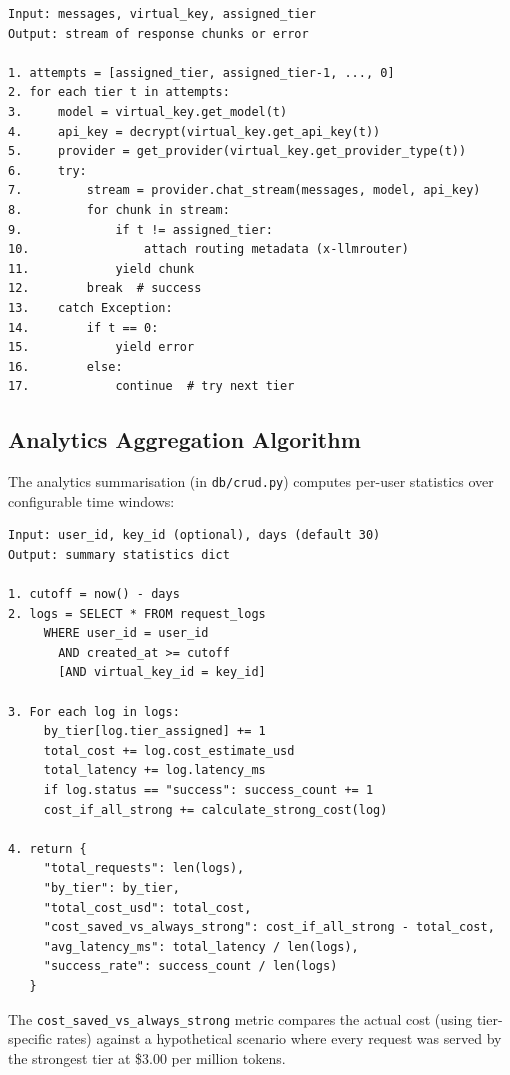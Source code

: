 \documentclass[12pt,a4paper]{report}
\begin{document}
\begin{lstlisting}[caption={Cascading Fallback Algorithm}, label={lst:fallback_alg}]
Input: messages, virtual_key, assigned_tier
Output: stream of response chunks or error

1. attempts = [assigned_tier, assigned_tier-1, ..., 0]
2. for each tier t in attempts:
3.     model = virtual_key.get_model(t)
4.     api_key = decrypt(virtual_key.get_api_key(t))
5.     provider = get_provider(virtual_key.get_provider_type(t))
6.     try:
7.         stream = provider.chat_stream(messages, model, api_key)
8.         for chunk in stream:
9.             if t != assigned_tier:
10.                attach routing metadata (x-llmrouter)
11.            yield chunk
12.        break  # success
13.    catch Exception:
14.        if t == 0:
15.            yield error
16.        else:
17.            continue  # try next tier
\end{lstlisting}

\subsection{Analytics Aggregation Algorithm}

The analytics summarisation (in \texttt{db/crud.py}) computes per-user statistics over configurable time windows:

\begin{lstlisting}[caption={Analytics Aggregation Pseudocode}, label={lst:analytics}]
Input: user_id, key_id (optional), days (default 30)
Output: summary statistics dict

1. cutoff = now() - days
2. logs = SELECT * FROM request_logs
     WHERE user_id = user_id
       AND created_at >= cutoff
       [AND virtual_key_id = key_id]

3. For each log in logs:
     by_tier[log.tier_assigned] += 1
     total_cost += log.cost_estimate_usd
     total_latency += log.latency_ms
     if log.status == "success": success_count += 1
     cost_if_all_strong += calculate_strong_cost(log)

4. return {
     "total_requests": len(logs),
     "by_tier": by_tier,
     "total_cost_usd": total_cost,
     "cost_saved_vs_always_strong": cost_if_all_strong - total_cost,
     "avg_latency_ms": total_latency / len(logs),
     "success_rate": success_count / len(logs)
   }
\end{lstlisting}

The \texttt{cost\_saved\_vs\_always\_strong} metric compares the actual cost (using tier-specific rates) against a hypothetical scenario where every request was served by the strongest tier at \$3.00 per million tokens.
\end{document}
